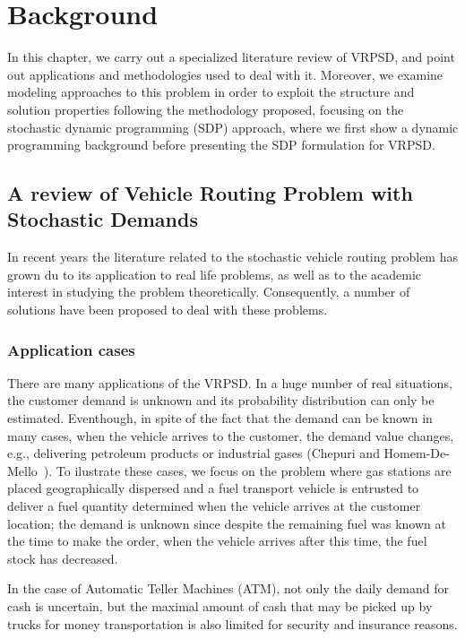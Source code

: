 \chapter{Background}
\label{chap:backgroud}

In this chapter, we carry out a specialized literature review of VRPSD, and point out applications and methodologies used to deal with it. Moreover, we examine modeling approaches to this problem in order to exploit the structure and solution properties following the methodology proposed, focusing on the stochastic dynamic programming (SDP) approach, where we first show a dynamic programming background before presenting the SDP formulation for VRPSD.


\section{A review of Vehicle Routing Problem with Stochastic Demands}

In recent years the literature related to the stochastic vehicle routing problem has grown du to its application to real life problems, as well as to the academic interest in studying the problem theoretically. Consequently, a number of solutions have been proposed to deal with these problems.

\subsection{Application cases}

There are many applications of the VRPSD. In a huge number of real situations, the customer demand is unknown and its probability distribution can only be estimated. Eventhough, in spite of the fact that the demand can be known in many cases, when the vehicle arrives to the customer, the demand value changes, e.g., delivering petroleum products or industrial gases (Chepuri and Homem-De-Mello~\cite{Chepuri}). To ilustrate these cases, we focus on the problem where gas stations are placed geographically dispersed and a fuel transport vehicle is entrusted to deliver a fuel quantity determined when the vehicle arrives at the customer location; the demand is unknown since despite the remaining fuel was known at the time to make the order, when the vehicle arrives after this time, the fuel stock has decreased.

In the case of Automatic Teller Machines (ATM), not only the daily demand for cash is uncertain, but the maximal amount of cash that may be picked up by trucks for money transportation is also limited for security and insurance reasons.

